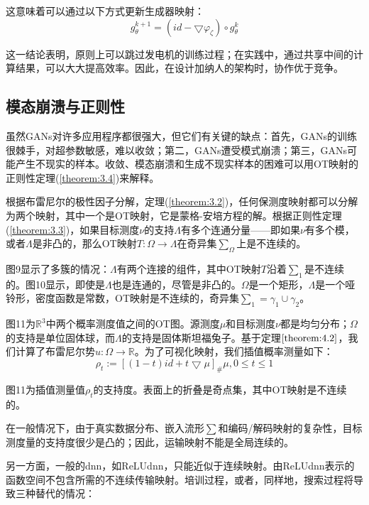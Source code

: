 这意味着可以通过以下方式更新生成器映射：
\begin{equation}
	g_{\theta }^{k+1}=(id-\bigtriangledown \varphi _{\zeta }) \circ g_{\theta }^{k}
	\label{function:33}
\end{equation}

这一结论表明，原则上可以跳过发电机的训练过程；在实践中，通过共享中间的计算结果，可以大大提高效率。因此，在设计加纳人的架构时，协作优于竞争。

\subsection{模态崩溃与正则性}

虽然GANs对许多应用程序都很强大，但它们有关键的缺点：首先，GANs的训练很棘手，对超参数敏感，难以收敛；第二，GANs遭受模式崩溃；第三，GANs可能产生不现实的样本。收敛、模态崩溃和生成不现实样本的困难可以用OT映射的正则性定理(\ref{theorem:3.4})来解释。

根据布雷尼尔的极性因子分解，定理(\ref{theorem:3.2})，任何保测度映射都可以分解为两个映射，其中一个是OT映射，它是蒙格-安培方程的解。根据正则性定理(\ref{theorem:3.3})，如果目标测度$\nu$的支持$\Lambda$有多个连通分量——即如果$\nu$有多个模，或者$\Lambda$是非凸的，那么OT映射$T: \Omega \to \Lambda$在奇异集$\sum _{\Omega}$上是不连续的。

图9显示了多簇的情况：$\Lambda$有两个连接的组件，其中OT映射$T$沿着$\sum_1$是不连续的。图10显示，即使是$\Lambda$也是连通的，尽管是非凸的。$\Omega$是一个矩形，$\Lambda$是一个哑铃形，密度函数是常数，OT映射是不连续的，奇异集$\sum_1 = \gamma_1 \cup \gamma_2$。

图11为$\mathbb{R}^3$中两个概率测度值之间的OT图。源测度$\mu$和目标测度$\nu$都是均匀分布；$\Omega$的支持是单位固体球，而$\Lambda
$的支持是固体斯坦福兔子。基于定理$\ref{theorem:4.2}$，我们计算了布雷尼尔势$u:\Omega \to \mathbb{R}$。为了可视化映射，我们插值概率测量如下：
\begin{equation*}
	\rho _t := \left [ (1-t)id+t\bigtriangledown \mu \right ]_{\#} \mu , 0 \le t \le 1 
\end{equation*}

图11为插值测量值$\rho_t$的支持度。表面上的折叠是奇点集，其中OT映射是不连续的。

在一般情况下，由于真实数据分布、嵌入流形$\sum$和编码/解码映射的复杂性，目标测度量的支持度很少是凸的；因此，运输映射不能是全局连续的。

另一方面，一般的dnn，如ReLUdnn，只能近似于连续映射。由ReLUdnn表示的函数空间不包含所需的不连续传输映射。培训过程，或者，同样地，搜索过程将导致三种替代的情况：

